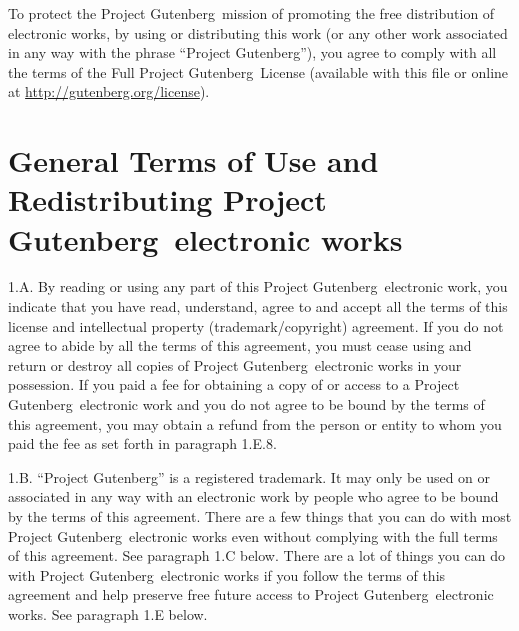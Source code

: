 
To protect the Project Gutenberg\texttrademark\ mission of promoting
the free distribution of electronic works, by using or distributing
this work (or any other work associated in any way with the phrase
``Project Gutenberg''), you agree to comply with all the terms of the
Full Project Gutenberg\texttrademark\ License (available with this
file or online at \url{http://gutenberg.org/license}).


\section[General Terms of Use]
{General Terms of Use and Redistributing Project Gutenberg\texttrademark\ electronic works}
\label{license:sec:general-tou}

1.A.  By reading or using any part of this Project
Gutenberg\texttrademark\ electronic work, you
indicate that you have read, understand, agree to and accept all the
terms of this license and intellectual property (trademark/copyright)
agreement.  If you do not agree to abide by all the terms of this
agreement, you must cease using and return or destroy all copies of
Project Gutenberg\texttrademark\ electronic works in
your possession.  If you paid a fee for obtaining a copy of or access
to a Project Gutenberg\texttrademark\ electronic work
and you do not agree to be bound by the terms of this agreement, you
may obtain a refund from the person or entity to whom you paid the fee
as set forth in paragraph 1.E.8.

1.B.  ``Project Gutenberg'' is a registered trademark.  It may only be
used on or associated in any way with an electronic work by people who
agree to be bound by the terms of this agreement.  There are a few
things that you can do with most Project
Gutenberg\texttrademark\ electronic works even
without complying with the full terms of this agreement.  See
paragraph 1.C below.  There are a lot of things you can do with
Project Gutenberg\texttrademark\ electronic works if
you follow the terms of this agreement and help preserve free future
access to Project Gutenberg\texttrademark\ electronic
works.  See paragraph 1.E below.

